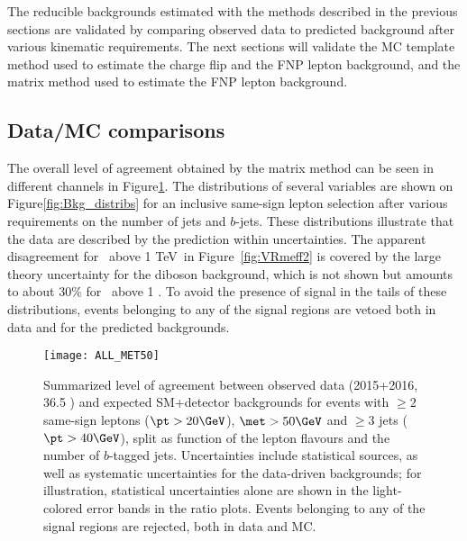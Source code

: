 The reducible backgrounds estimated with the methods described in the previous 
sections are validated by comparing observed data to 
predicted background after various kinematic requirements. 
The next sections will validate 
the MC template method used to estimate the charge flip and the FNP lepton 
background, and the matrix method used to estimate the FNP lepton background.



\subsection*{Data/MC comparisons}

The overall level of agreement obtained by the matrix method
can be seen in different channels in Figure\ref{fig:distributions_summary}. 
The distributions of several variables are shown on Figure\ref{fig:Bkg_distribs} for an inclusive same-sign lepton selection
after various requirements on the number of jets and $b$-jets.
These distributions illustrate that the data are described by the prediction 
within uncertainties. 
The apparent disagreement 
for \meff\ above 1 TeV~in Figure~\ref{fig:VRmeff2} is covered by the large 
theory uncertainty for the diboson background, which is not shown 
but amounts to about 30\% for \meff\ above 1 \TeV. 
To avoid the presence of signal in the tails of these distributions, 
events belonging to any of the signal regions are vetoed 
both in data and for the predicted backgrounds. 

\begin{figure}[htb!]
\centering
\texttt{[image: ALL\_MET50]}
\caption{Summarized level of agreement between observed data (2015+2016, 36.5 \ifb) and expected SM+detector backgrounds 
for events with $\ge 2$ same-sign leptons ($\pt>20 \GeV$), $\met>50 \GeV$ and $\ge 3$ jets ($\pt>40 \GeV$), 
split as function of the lepton flavours and the number of $b$-tagged jets. 
Uncertainties include statistical sources, as well as systematic uncertainties for the data-driven backgrounds; 
for illustration, statistical uncertainties alone are shown in the light-colored error bands in the ratio plots. 
Events belonging to any of the signal regions are rejected, both in data and MC. 
}
\label{fig:distributions_summary}
\end{figure} 

